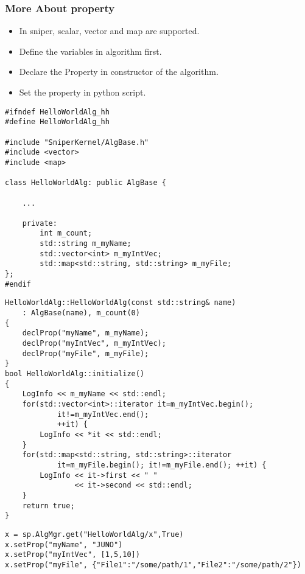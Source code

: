 \begin{frame}
    \frametitle{More About property}
    \begin{itemize}
        \item In sniper, scalar, vector and map are supported.
        \item Define the variables in algorithm first.
        \item Declare the Property in constructor of the algorithm.
        \item Set the property in python script.
    \end{itemize}
\end{frame}

\newsavebox{\createalgmorepropheader}
\begin{lrbox}{\createalgmorepropheader}
\begin{lstlisting}
#ifndef HelloWorldAlg_hh
#define HelloWorldAlg_hh

#include "SniperKernel/AlgBase.h"
#include <vector>
#include <map>

class HelloWorldAlg: public AlgBase {

    ...

    private:
        int m_count;
        std::string m_myName;
        std::vector<int> m_myIntVec;
        std::map<std::string, std::string> m_myFile;
};
#endif
\end{lstlisting}
\end{lrbox}
\newsavebox{\createalgmorepropimpl}
\begin{lrbox}{\createalgmorepropimpl}
\begin{lstlisting}
HelloWorldAlg::HelloWorldAlg(const std::string& name)
    : AlgBase(name), m_count(0)
{
    declProp("myName", m_myName);
    declProp("myIntVec", m_myIntVec);
    declProp("myFile", m_myFile);
}
bool HelloWorldAlg::initialize()
{
    LogInfo << m_myName << std::endl;
    for(std::vector<int>::iterator it=m_myIntVec.begin();
            it!=m_myIntVec.end();
            ++it) {
        LogInfo << *it << std::endl;
    }
    for(std::map<std::string, std::string>::iterator 
            it=m_myFile.begin(); it!=m_myFile.end(); ++it) {
        LogInfo << it->first << " "
                << it->second << std::endl;
    }
    return true;
}
\end{lstlisting}
\end{lrbox}
\newsavebox{\createalgmoreproppython}
\begin{lrbox}{\createalgmoreproppython}
\begin{lstlisting}
x = sp.AlgMgr.get("HelloWorldAlg/x",True)
x.setProp("myName", "JUNO")
x.setProp("myIntVec", [1,5,10])
x.setProp("myFile", {"File1":"/some/path/1","File2":"/some/path/2"})
\end{lstlisting}
\end{lrbox}

